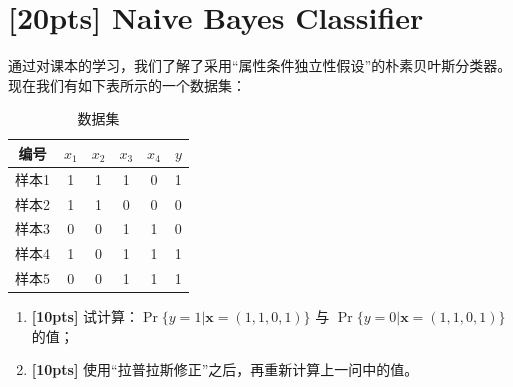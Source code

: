 \documentclass[a4paper,UTF8]{article}
\numberwithin{equation}{section}
\begin{document}
\section{[20pts] Naive Bayes Classifier}
	
	通过对课本的学习，我们了解了采用“属性条件独立性假设”的朴素贝叶斯分类器。现在我们有如下表所示的一个数据集：
	\begin{table}[htp]
		\centering
		\caption{数据集}\label{tab:aStrangeTable}
	\begin{tabular}{c|ccccc}
		\hline 
	编号	& $x_1$ & $x_2$ & $x_3$ & $x_4$ & $y$ \\ 
		\hline 
	样本1	& 1 & 1 & 1 & 0 & 1 \\ 
		\hline 
	样本2	& 1 & 1 & 0 & 0 & 0 \\ 
		\hline 
	样本3	& 0 & 0 & 1 & 1 & 0 \\ 
		\hline 
	样本4	& 1 & 0 & 1 & 1 & 1 \\ 
		\hline 
	样本5	& 0 & 0 & 1 & 1 & 1 \\ 
		\hline 
	\end{tabular}
	\end{table} 
	
	\begin{enumerate}[ {(}1{)}]
		\item \textbf{[10pts]} 试计算：$\Pr\{ y=1 | \mathbf{x}=(1,1,0,1) \}$ 与 $\Pr\{ y=0 | \mathbf{x}=(1,1,0,1) \}$ 的值；
		\item \textbf{[10pts]} 使用“拉普拉斯修正”之后，再重新计算上一问中的值。
	\end{enumerate}
	
\end{document}
